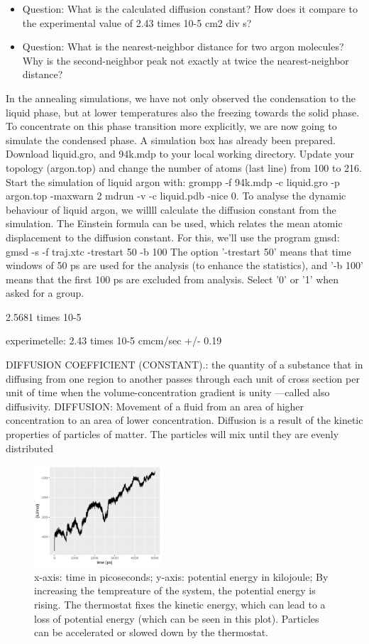 \documentclass[10pt, a4paper, oneside, twocolumn]{article}
\begin{document}
\begin{itemize}
    \item Question: What is the calculated diffusion constant? How does it compare to the experimental value of 2.43 times 10-5 cm2 div s?
    \item  Question: What is the nearest-neighbor distance for two argon molecules? Why is the second-neighbor peak not exactly at twice the nearest-neighbor distance?
\end{itemize}

In the annealing simulations, we have not only observed the condensation to the liquid phase, but at lower temperatures also the freezing towards the solid phase. To concentrate on this phase transition more explicitly, we are now going to simulate the condensed phase. A simulation box has already been prepared. Download liquid.gro, and 94k.mdp to your local working directory. Update your topology (argon.top) and change the number of atoms (last line) from 100 to 216. Start the simulation of liquid argon with:
grompp -f 94k.mdp -c liquid.gro -p argon.top -maxwarn 2
mdrun -v -c liquid.pdb -nice 0. To analyse the dynamic behaviour of liquid argon, we willll calculate the diffusion constant from the simulation. The Einstein formula can be used, which relates the mean atomic displacement to the diffusion constant. For this, we'll use the program gmsd:
gmsd -s -f traj.xtc -trestart 50 -b 100
The option '-trestart 50' means that time windows of 50 ps are used for the analysis (to enhance the statistics), and '-b 100' means that the first 100 ps are excluded from analysis. Select '0' or '1' when asked for a group.

2.5681 times 10-5

experimetelle:
2.43 times 10-5 cmcm/sec
+/- 0.19

DIFFUSION COEFFICIENT (CONSTANT).: the quantity of a substance that in diffusing from one region to another passes through each unit of cross section per unit of time when the volume-concentration gradient is unity —called also diffusivity.
DIFFUSION:
Movement of a fluid from an area of higher concentration to an area of lower concentration. Diffusion is a result of the kinetic properties of particles of matter. The particles will mix until they are evenly distributed

\begin{figure}[t]
    \centering
    \includegraphics[width=180px]{plots/Heatup/pot_energy_heatup.png}
    \caption{x-axis: time in picoseconds; y-axis: potential energy in kilojoule; By increasing the tempreature of the system, the potential energy is rising. The thermostat fixes the kinetic energy, which can lead to a loss of potential energy (which can be seen in this plot). Particles can be accelerated or slowed down by the thermostat.}
    \label{heatup_potentialenergy}
\end{figure}
\end{document}
